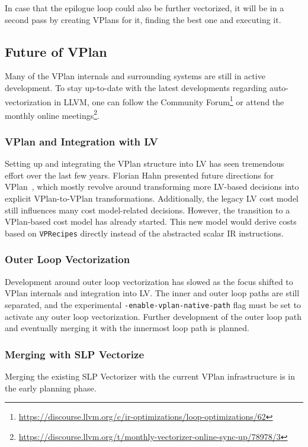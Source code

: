 \documentclass[sigplan,11pt,nonacm]{acmart}
\begin{document}
In case that the epilogue loop could also be further vectorized, it will be in a second 
pass by creating VPlans for it, finding the best one and executing it.

\subsection{Future of VPlan}
Many of the VPlan internals and surrounding systems are still in active development. To stay up-to-date 
with the latest developments regarding auto-vectorization in LLVM, one can follow the 
Community Forum\footnote{\url{https://discourse.llvm.org/c/ir-optimizations/loop-optimizations/62}} or
attend the monthly online 
meetings\footnote{\url{https://discourse.llvm.org/t/monthly-vectorizer-online-sync-up/78978/3}}.

\subsubsection{VPlan and Integration with LV}
Setting up and integrating the VPlan structure into LV has seen tremendous effort over the last 
few years. Florian Hahn presented future directions for 
VPlan~\cite{llvmvplanupdate}, which mostly revolve around transforming more LV-based decisions into
explicit VPlan-to-VPlan transformations. Additionally, the legacy LV cost model still influences 
many cost model-related decisions. However, the transition to a VPlan-based cost model has already 
started. This new model would derive costs based on \texttt{VPRecipes} directly instead of the 
abstracted scalar IR instructions.

\subsubsection{Outer Loop Vectorization}
Development around outer loop vectorization has slowed as the focus shifted to VPlan internals 
and integration into LV. The inner and outer loop paths are still separated, and the 
experimental \texttt{-enable-\allowbreak vplan-\allowbreak native-\allowbreak path} flag must be 
set to activate any outer 
loop vectorization. Further development of the outer loop path and eventually merging it 
with the innermost loop path is planned.

\subsubsection{Merging with SLP Vectorize}
Merging the existing SLP Vectorizer with the current VPlan infrastructure is in the early planning phase.
\end{document}
